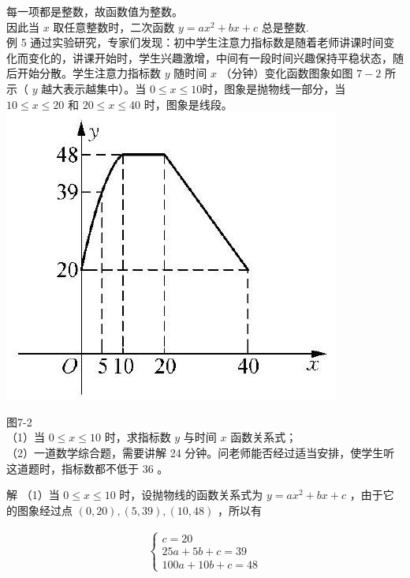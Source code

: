 \documentclass[10pt]{article}
\begin{document}
每一项都是整数，故函数值为整数。\\
因此当 $x$ 取任意整数时，二次函数 $y=a x^{2}+b x+c$ 总是整数.\\
例 5 通过实验研究，专家们发现：初中学生注意力指标数是随着老师讲课时间变化而变化的，讲课开始时，学生兴趣激增，中间有一段时间兴趣保持平稳状态，随后开始分散。学生注意力指标数 $y$ 随时间 $x$ （分钟）变化函数图象如图 $7-2$ 所示（ $y$ 越大表示越集中）。当 $0 \leqslant x \leqslant 10$时，图象是抛物线一部分，当 $10 \leqslant x \leqslant 20$ 和 $20 \leqslant x \leqslant 40$ 时，图象是线段。\\
\includegraphics[max width=\textwidth, center]{2024_10_30_1bf34f7aeb61f11d11d3g-096}

图7-2\\
（1）当 $0 \leqslant x \leqslant 10$ 时，求指标数 $y$ 与时间 $x$ 函数关系式；\\
（2）一道数学综合题，需要讲解 24 分钟。问老师能否经过适当安排，使学生听这道题时，指标数都不低于 36 。

解 （1）当 $0 \leqslant x \leqslant 10$ 时，设抛物线的函数关系式为 $y=a x^{2}+b x+c$ ，由于它的图象经过点 $(0,20),(5,39),(10,48)$ ，所以有

\begin{align*}
\left\{\begin{array}{l}
c=20 \\
25 a+5 b+c=39 \\
100 a+10 b+c=48
\end{array}\right.
\end{align*}
\end{document}
